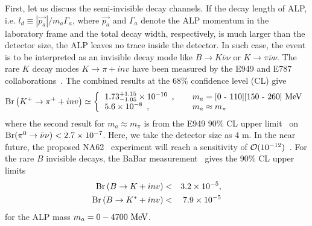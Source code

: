 \documentclass[preprint,prd,aps,tighten,nofootinbib,amssymb]{revtex4}
\newcommand{\bea}{\begin{eqnarray}}
\newcommand{\eea}{\end{eqnarray}}
\begin{document}
First, let us discuss the semi-invisible decay channels. 
If the decay length of ALP, i.e. $l_d \equiv |\overrightarrow{p_a} | /m_a \Gamma_a$, where $\overrightarrow{p_a}$ and $\Gamma_a$ denote the ALP momentum in the laboratory frame and the total decay width, respectively,  is much larger than the detector size, the ALP leaves no trace inside the detector. In such case, the event is to be interpreted as an invisible decay mode like
$B\rightarrow K \bar{\nu}\nu$ or $K\rightarrow \pi \bar{\nu}\nu$.
The rare $K$ decay modes $K \rightarrow \pi + inv$ have been measured by the E949 and E787 collaborations~\cite{Artamonov:2009sz}. The combined results at the $68\%$ confidence level (CL) give
\bea
{\rm Br}\left(K^+ \rightarrow \pi^+ + inv \right) \simeq \left\{ 
\begin{tabular}{ll}
$1.73^{+1.15}_{-1.05}  \times 10^{-10}$\, , & \quad$m_a = [0$ - $110] [150$ - $260]~{\rm MeV}$\\
$5.6 \times 10^{-8} $\, , & \quad$m_a \approx m_\pi $
\end{tabular}
\right.
\eea
where the second result for $m_a\approx m_\pi$ is from the E949 $90\%$ CL upper limit~\cite{Artamonov:2005cu} on ${\rm Br} (\pi^0 \rightarrow \bar{\nu}\nu) < 2.7 \times 10^{-7}$. Here, we take the detector size as 4 m.
In the near future, the proposed NA62~\cite{Anelli:2005ju} experiment will reach a sensitivity of ${\cal O}(10^{-12})$~\cite{Moulson:2016dul}.
For the rare $B$ invisible decays, the BaBar measurement~\cite{Lees:2013kla} gives the $90\%$ CL upper limits
\bea
{\rm Br}\left(B \rightarrow K + inv \right) &<& 3.2 \times 10^{-5},\nonumber \\
{\rm Br}\left(B \rightarrow K^* + inv \right) &<& 7.9 \times 10^{-5}
\eea
for the ALP mass $m_a=0-4700~{\rm MeV}$.
\end{document}
